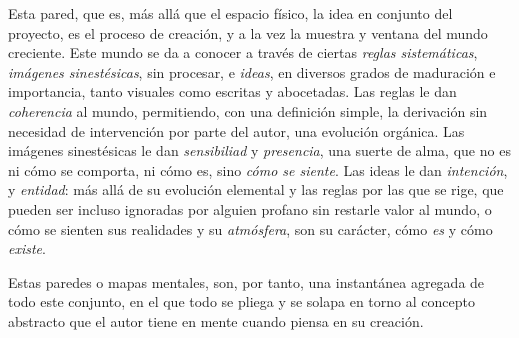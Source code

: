 \documentclass[twoside]{article}
\begin{document}
\begin{multicols}{2}
  Esta pared, que es, más allá que el espacio físico, la idea en conjunto
  del proyecto, es el proceso de creación, y a la vez la muestra y ventana
  del mundo creciente. Este mundo se da a conocer a través de ciertas
  \emph{reglas sistemáticas}, \emph{imágenes sinestésicas}, sin procesar,
  e \emph{ideas}, en diversos grados de maduración e importancia, tanto
  visuales como escritas y abocetadas. Las reglas le dan \emph{coherencia}
  al mundo, permitiendo, con una definición simple, la derivación sin
  necesidad de intervención por parte del autor, una evolución orgánica.
  Las imágenes sinestésicas le dan \emph{sensibiliad} y \emph{presencia},
  una suerte de alma, que no es ni cómo se comporta, ni cómo es, sino
  \emph{cómo se siente}. Las ideas le dan \emph{intención}, y
  \emph{entidad}: más allá de su evolución elemental y las reglas por las
  que se rige, que pueden ser incluso ignoradas por alguien profano sin
  restarle valor al mundo, o cómo se sienten sus realidades y su
  \emph{atmósfera}, son su carácter, cómo \emph{es} y cómo \emph{existe}.

  Estas paredes o mapas mentales, son, por tanto, una instantánea agregada
  de todo este conjunto, en el que todo se pliega y se solapa en torno al
  concepto abstracto que el autor tiene en mente cuando piensa en su
  creación.

\end{multicols}
\end{document}
